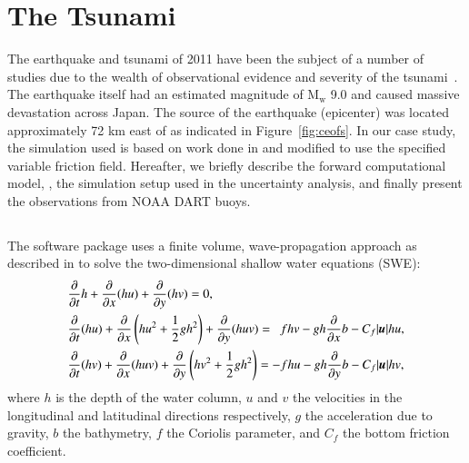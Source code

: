 \section{The \tohoku Tsunami} 
\label{sec:tohoku}

The \tohoku earthquake and tsunami of 2011 have been the subject of a number of
studies due to the wealth of observational evidence and severity of the tsunami~\cite{Kawase2014}.
The earthquake itself had an estimated magnitude of $\text{M}_\text{w}$ 9.0 and
caused massive devastation across Japan. The source of the earthquake (epicenter)
was located approximately 72 km east of \tohoku as indicated 
in Figure~\ref{fig:ceofs}. In our case study, the
simulation used is based on work done in \cite{MacInnes:2013cr} and modified to 
use the specified variable friction field. Hereafter, we briefly describe the
forward computational model, \geoclaw, the  simulation setup used in the
uncertainty analysis, and finally present the observations from NOAA DART buoys.


\subsection{\geoclaw} \label{ssub:geoclaw}
The \geoclaw software package uses a finite volume, wave-propagation approach as
described in \cite{LeVeque:1997eg} to solve the two-dimensional shallow water
equations (SWE):
\begin{equation} \label{eq:swe}
    \begin{aligned}
    &\pd{}{t} h + \pd{}{x} (hu) + \pd{}{y} (hv) = 0, \\
    &\pd{}{t}(hu) + \pd{}{x} \left(hu^2 + \frac{1}{2} g h^2 \right ) + \pd{}{y} (huv) = ~~ fhv - gh \pd{}{x} b - C_f |\vec{u}| hu, \\
    &\pd{}{t} (hv) + \pd{}{x} (huv) + \pd{}{y} \left (hv^2 + \frac{1}{2} gh^2 \right) = -fhu - gh \pd{}{y} b - C_f |\vec{u}| hv,
    \end{aligned}
\end{equation} 
where $h$ is the depth of the water column, $u$ and $v$ the velocities in the 
longitudinal and latitudinal directions respectively, $g$ the acceleration due 
to gravity, $b$ the bathymetry, $f$ the Coriolis parameter, and $C_f$ the bottom 
friction coefficient.  

